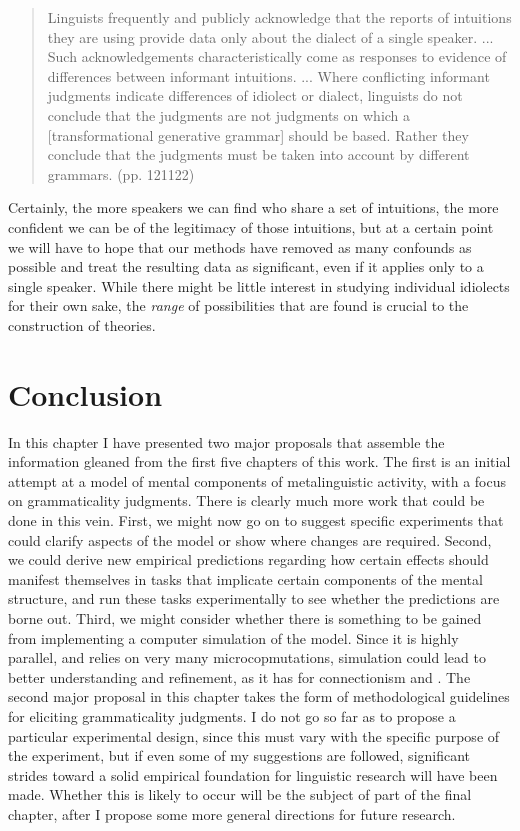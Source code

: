  \begin{quote}
 Linguists frequently and publicly acknowledge that the reports of intuitions they are using provide data only about the dialect of a single speaker. ... Such acknowledgements characteristically come as responses to evidence of differences between informant intuitions. ... Where conflicting informant judgments indicate differences of idiolect or dialect, linguists do not conclude that the judgments are not judgments on which a [transformational generative grammar] should be based. Rather they conclude that the judgments must be taken into account by different grammars. (pp. 121\textendash{}122)
 \end{quote}

 \noindent
 Certainly, the more speakers we can find who share a set of intuitions, the more confident we can be of the legitimacy of those intuitions, but at a certain point we will have to hope that our methods have removed as many confounds as possible and treat the resulting data as significant, even if it applies only to a single speaker. While there might be little interest in studying individual idiolects for their own sake, the \textit{range} of possibilities that are found is crucial to the construction of theories.

 \section{Conclusion}\label{sec:6.4}

 In this chapter I have presented two major proposals that assemble the information gleaned from the first five chapters of this work. The first is an initial attempt at a model of mental components of metalinguistic activity, with a focus on grammaticality judgments. There is clearly much more work that could be done in this vein. First, we might now go on to suggest specific experiments that could clarify aspects of the model or show where changes are required. Second, we could derive new empirical predictions regarding how certain effects should manifest themselves in tasks that implicate certain components of the mental structure, and run these tasks experimentally to see whether the predictions are borne out. Third, we might consider whether there is something to be gained from implementing a computer simulation of the model. Since it is highly parallel, and
 relies on very many microcopmutations, simulation could lead to better understanding and refinement, as it has for connectionism and . The second major proposal  in this chapter takes the form of methodological guidelines for eliciting grammaticality judgments. I do not go so far as to propose a particular experimental design, since this must vary with the specific purpose of the experiment, but if even some of my suggestions are followed, significant strides toward a solid empirical foundation for linguistic research will have been made. Whether this is likely to occur will be the subject of part of the final chapter, after I propose some more general directions for future research.